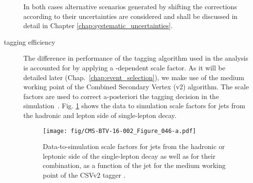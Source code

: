 \begin{description}
In both cases alternative scenarios generated by shifting the corrections according to their uncertainties are considered and shall be discussed in detail in Chapter \ref{chap:systematic_uncertainties}.


\item[\cPqb tagging efficiency]

The difference in performance of the \cPqb tagging algorithm used in the analysis is accounted for by applying a \pt-dependent scale factor. As it will be detailed later (Chap.~\ref{chap:event_selection}), we make use of the medium working point of the Combined Secondary Vertex (v2) algorithm. The scale factors are used to correct a-posteriori the \cPqb tagging decision in the simulation~\cite{twiki:BTV}. Fig. \ref{fig:btag_sf} shows the data to simulation scale factors for \cPqb jets from the hadronic and lepton side of single-lepton \ttbar decay.

\begin{figure}[htp]
\centering
  \def\twidth{0.45}
  \centering
    \texttt{[image: fig/CMS-BTV-16-002\_Figure\_046-a.pdf]}
\caption{Data-to-simulation scale factors for \cPqb jets from the hadronic or leptonic side of the single-lepton \ttbar decay as well as for their combination, as a function of the jet \pt for the medium working point of the CSVv2 tagger \cite{Sirunyan:2017ezt}. }
\label{fig:btag_sf}
\end{figure}


\end{description}


